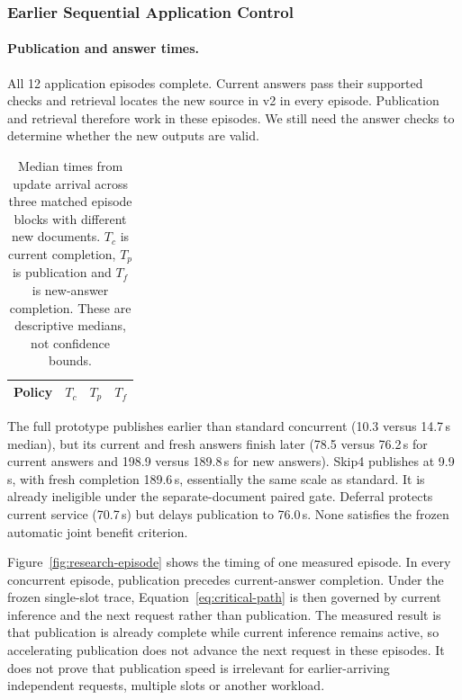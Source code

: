 \subsubsection{Earlier Sequential Application Control}
\label{sec:joint}
\paragraph{Publication and answer times.}
All 12 application episodes complete. Current answers pass their supported
checks and retrieval locates the new source in v2 in every episode. Publication and retrieval therefore work in these episodes. We still need
the answer checks to determine whether the new outputs are valid.

\begin{table}[t]
\caption{Median times from update arrival across three matched episode blocks
with different new documents. $T_c$ is current completion, $T_p$ is publication and $T_f$ is new-answer completion. These are descriptive medians, not confidence bounds.}
\label{tab:joint}
\centering
\begin{tabular}{lrrr}
\toprule
Policy & $T_c$ & $T_p$ & $T_f$\\
\midrule

\end{tabular}
\end{table}
The full prototype publishes earlier than standard concurrent (10.3 versus
14.7\,s median), but its current and fresh answers finish later (78.5 versus
76.2\,s for current answers and 198.9 versus 189.8\,s for new answers). Skip4 publishes at 9.9\,s, with fresh completion
189.6\,s, essentially the same scale as standard. It is already ineligible under
the separate-document paired gate. Deferral protects current service (70.7\,s)
but delays publication to 76.0\,s. None satisfies the frozen automatic joint
benefit criterion.

Figure~\ref{fig:research-episode} shows the timing of one measured episode. In every
concurrent episode, publication precedes current-answer completion. Under the
frozen single-slot trace, Equation~\ref{eq:critical-path} is then governed by
current inference and the next request rather than publication. The measured result is that publication is already complete while
current inference remains active, so accelerating publication does not advance
the next request in these episodes. It does not
prove that publication speed is irrelevant for earlier-arriving independent
requests, multiple slots or another workload.


